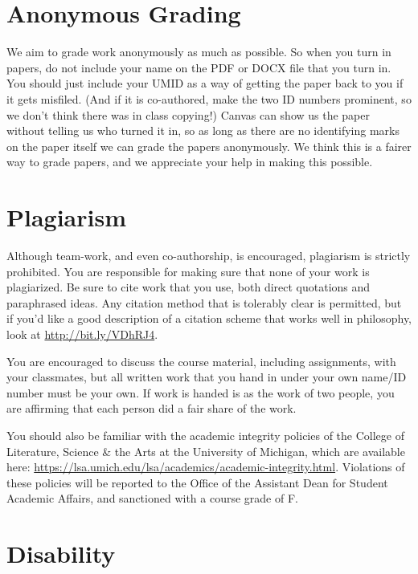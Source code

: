 \documentclass[
]{article}
\begin{document}
\hypertarget{anonymous-grading}{%
\section{Anonymous Grading}\label{anonymous-grading}}

We aim to grade work anonymously as much as possible. So when you turn
in papers, do not include your name on the PDF or DOCX file that you
turn in. You should just include your UMID as a way of getting the paper
back to you if it gets misfiled. (And if it is co-authored, make the two
ID numbers prominent, so we don't think there was in class copying!)
Canvas can show us the paper without telling us who turned it in, so as
long as there are no identifying marks on the paper itself we can grade
the papers anonymously. We think this is a fairer way to grade papers,
and we appreciate your help in making this possible.

\hypertarget{plagiarism}{%
\section{Plagiarism}\label{plagiarism}}

Although team-work, and even co-authorship, is encouraged, plagiarism is
strictly prohibited. You are responsible for making sure that none of
your work is plagiarized. Be sure to cite work that you use, both direct
quotations and paraphrased ideas. Any citation method that is tolerably
clear is permitted, but if you'd like a good description of a citation
scheme that works well in philosophy, look at
\url{http://bit.ly/VDhRJ4}.

You are encouraged to discuss the course material, including
assignments, with your classmates, but all written work that you hand in
under your own name/ID number must be your own. If work is handed is as
the work of two people, you are affirming that each person did a fair
share of the work.

You should also be familiar with the academic integrity policies of the
College of Literature, Science \& the Arts at the University of
Michigan, which are available here:
\url{https://lsa.umich.edu/lsa/academics/academic-integrity.html}.
Violations of these policies will be reported to the Office of the
Assistant Dean for Student Academic Affairs, and sanctioned with a
course grade of F.

\hypertarget{disability}{%
\section{Disability}\label{disability}}
\end{document}
